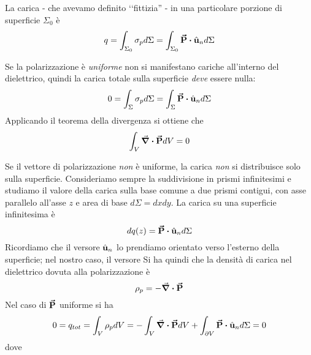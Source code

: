 \noindent La carica - che avevamo definito ‘‘fittizia'' - in una particolare porzione di superficie $\Sigma_0$ è
\begin{equation}
	q=\int_{\Sigma_0}\sigma_pd\Sigma=\int_{\Sigma_0}\vba{P}\vdot \vbh{u}_nd\Sigma
	\end{equation}
\begin{observe}
	Se la polarizzazione è \textit{uniforme} non si manifestano cariche all'interno del dielettrico, quindi la carica totale sulla superficie \textit{deve} essere nulla:
	\begin{equation*}
		0=\int_{\Sigma} \sigma_p d\Sigma=\int_\Sigma \vba{P}\vdot\vbh{u}_nd\Sigma
	\end{equation*}
	Applicando il teorema della divergenza si ottiene che
	\begin{equation}
		\int_{V}\div{\vb*{\va{P}}}dV=0
	\end{equation}
\end{observe}
Se il vettore di polarizzazione \textit{non} è uniforme, la carica \textit{non} si distribuisce solo sulla superficie. Consideriamo sempre la suddivisione in prismi infinitesimi e studiamo il valore della carica sulla base comune a due prismi contigui, con asse parallelo all'asse $z$ e area di base $d\Sigma=dxdy$.
La carica su una superficie infinitesima è
\begin{equation*}
	dq(z)=\vba{P}\vdot \vbh{u}_nd\Sigma
\end{equation*}
Ricordiamo che il versore $\hat{\mathbf{u}}_n$ lo prendiamo orientato verso l'esterno della superficie; nel nostro caso, il versore
Si ha quindi che la densità di carica nel dielettrico dovuta alla polarizzazione è
\begin{equation}
	\rho_p=-\div{\vb*{\va{P}}}
\end{equation}
Nel caso di $\vb*{\va{P}}$ uniforme si ha
\begin{equation*}
	0=q_{tot}=\int_V\rho_pdV=-\int_V\div{\vba{P}}dV+\int_{\partial V}\vba{P}\vdot\vbh{u}_n d\Sigma=0
\end{equation*}
dove
